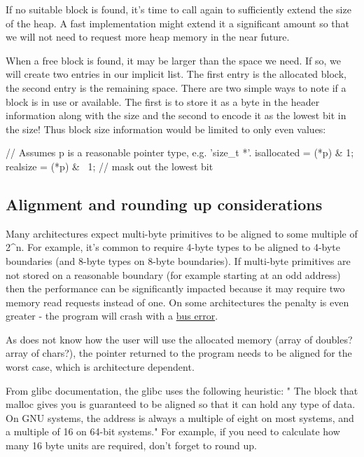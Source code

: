 If no suitable block is found, it's time to call  again to sufficiently extend the size of the heap. A fast implementation might extend it a significant amount so that we will not need to request more heap memory in the near future.

When a free block is found, it may be larger than the space we need. If so, we will create two entries in our implicit list. The first entry is the allocated block, the second entry is the remaining space. There are two simple ways to note if a block is in use or available. The first is to store it as a byte in the header information along with the size and the second to encode it as the lowest bit in the size! Thus block size information would be limited to only even values:

\begin{code}[language=C]
// Assumes p is a reasonable pointer type, e.g. 'size_t *'.
isallocated = (*p) & 1;
realsize = (*p) & ~1;  // mask out the lowest bit
\end{code}

\subsection{Alignment and rounding up considerations}

Many architectures expect multi-byte primitives to be aligned to some multiple of 2\^{}n. For example, it's common to require 4-byte types to be aligned to 4-byte boundaries (and 8-byte types on 8-byte boundaries). If multi-byte primitives are not stored on a reasonable boundary (for example starting at an odd address) then the performance can be significantly impacted because it may require two memory read requests instead of one. On some architectures the penalty is even greater - the program will crash with a \href{http://en.wikipedia.org/wiki/Bus_error\#Unaligned_access}{bus error}.

As  does not know how the user will use the allocated memory (array of doubles? array of chars?), the pointer returned to the program needs to be aligned for the worst case, which is architecture dependent.

From glibc documentation, the glibc  uses the following heuristic: " The block that malloc gives you is guaranteed to be aligned so that it can hold any type of data. On GNU systems, the address is always a multiple of eight on most systems, and a multiple of 16 on 64-bit systems." For example, if you need to calculate how many 16 byte units are required, don't forget to round up.

